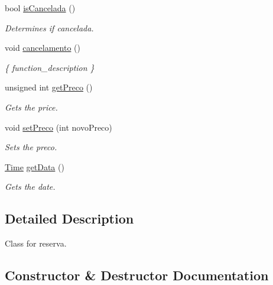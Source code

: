 \begin{DoxyCompactItemize}
bool \hyperlink{classReserva_a1fb3e7e1dfce5960dc888ac9929f014f}{is\+Cancelada} ()
\begin{DoxyCompactList}\small\item\em Determines if cancelada. \end{DoxyCompactList}\item 
void \hyperlink{classReserva_a05435b60142460ad2b0ccf61b7ea4531}{cancelamento} ()
\begin{DoxyCompactList}\small\item\em \{ function\+\_\+description \} \end{DoxyCompactList}\item 
unsigned int \hyperlink{classReserva_a7d6a55cda46a28d62af5870c98cbc3d5}{get\+Preco} ()
\begin{DoxyCompactList}\small\item\em Gets the price. \end{DoxyCompactList}\item 
void \hyperlink{classReserva_ac2d3c756eb1abc03f0661cc97e1600e6}{set\+Preco} (int novo\+Preco)
\begin{DoxyCompactList}\small\item\em Sets the preco. \end{DoxyCompactList}\item 
\hyperlink{classTime}{Time} \hyperlink{classReserva_a187007ee30ffdc2372739708901b6fc7}{get\+Data} ()
\begin{DoxyCompactList}\small\item\em Gets the date. \end{DoxyCompactList}\end{DoxyCompactItemize}


\subsection{Detailed Description}
Class for reserva. 

\subsection{Constructor \& Destructor Documentation}
